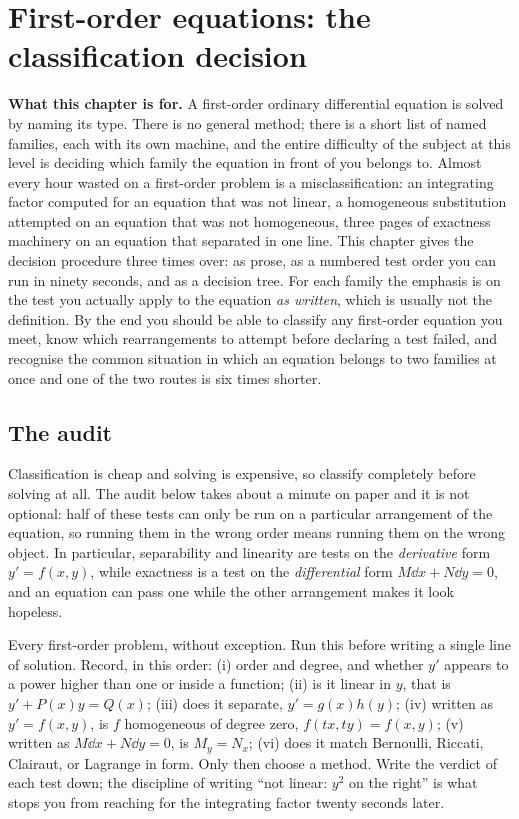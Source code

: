 \chapter{First-order equations: the classification decision}

\begin{orient}
\textbf{What this chapter is for.} A first-order ordinary differential equation is solved by naming its type. There is no general method; there is a short list of named families, each with its own machine, and the entire difficulty of the subject at this level is deciding which family the equation in front of you belongs to. Almost every hour wasted on a first-order problem is a misclassification: an integrating factor computed for an equation that was not linear, a homogeneous substitution attempted on an equation that was not homogeneous, three pages of exactness machinery on an equation that separated in one line. This chapter gives the decision procedure three times over: as prose, as a numbered test order you can run in ninety seconds, and as a decision tree. For each family the emphasis is on the test you actually apply to the equation \emph{as written}, which is usually not the definition. By the end you should be able to classify any first-order equation you meet, know which rearrangements to attempt before declaring a test failed, and recognise the common situation in which an equation belongs to two families at once and one of the two routes is six times shorter.
\end{orient}

\section{The audit}

Classification is cheap and solving is expensive, so classify completely before solving at all. The audit below takes about a minute on paper and it is not optional: half of these tests can only be run on a particular arrangement of the equation, so running them in the wrong order means running them on the wrong object. In particular, separability and linearity are tests on the \emph{derivative} form $y'=f(x,y)$, while exactness is a test on the \emph{differential} form $M\dd x+N\dd y=0$, and an equation can pass one while the other arrangement makes it look hopeless.

\cue Every first-order problem, without exception. Run this before writing a single line of solution.
\method Record, in this order: (i) order and degree, and whether $y'$ appears to a power higher than one or inside a function; (ii) is it linear in $y$, that is $y'+P(x)y=Q(x)$; (iii) does it separate, $y'=g(x)h(y)$; (iv) written as $y'=f(x,y)$, is $f$ homogeneous of degree zero, $f(tx,ty)=f(x,y)$; (v) written as $M\dd x+N\dd y=0$, is $M_y=N_x$; (vi) does it match Bernoulli, Riccati, Clairaut, or Lagrange in form. Only then choose a method. Write the verdict of each test down; the discipline of writing ``not linear: $y^{2}$ on the right'' is what stops you from reaching for the integrating factor twenty seconds later.

